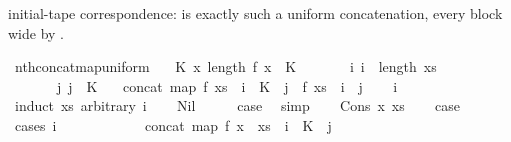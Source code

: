 \begin{isabellebody}
\begin{isamarkuptext}
  initial-tape correspondence:  is exactly
  such a uniform concatenation, every block 
  wide by .%
\end{isamarkuptext}\isamarkuptrue%
\isamarkupfalse%
\ nth{\isacharunderscore}{\kern0pt}concat{\isacharunderscore}{\kern0pt}map{\isacharunderscore}{\kern0pt}uniform{\isacharcolon}{\kern0pt}\isanewline
\ \ \ K{\isacharcolon}{\kern0pt}\ {\isachardoublequoteopen}{\isasymAnd}x{\isachardot}{\kern0pt}\ length\ {\isacharparenleft}{\kern0pt}f\ x{\isacharparenright}{\kern0pt}\ {\isacharequal}{\kern0pt}\ K{\isachardoublequoteclose}\isanewline
\ \ \ \ \ \ \ i{\isacharcolon}{\kern0pt}\ {\isachardoublequoteopen}i\ {\isacharless}{\kern0pt}\ length\ xs{\isachardoublequoteclose}\isanewline
\ \ \ \ \ \ \ j{\isacharcolon}{\kern0pt}\ {\isachardoublequoteopen}j\ {\isacharless}{\kern0pt}\ K{\isachardoublequoteclose}\isanewline
\ \ \ {\isachardoublequoteopen}concat\ {\isacharparenleft}{\kern0pt}map\ f\ xs{\isacharparenright}{\kern0pt}\ {\isacharbang}{\kern0pt}\ {\isacharparenleft}{\kern0pt}i\ {\isacharasterisk}{\kern0pt}\ K\ {\isacharplus}{\kern0pt}\ j{\isacharparenright}{\kern0pt}\ {\isacharequal}{\kern0pt}\ f\ {\isacharparenleft}{\kern0pt}xs\ {\isacharbang}{\kern0pt}\ i{\isacharparenright}{\kern0pt}\ {\isacharbang}{\kern0pt}\ j{\isachardoublequoteclose}\isanewline
%
\isadelimproof
\ \ %
\endisadelimproof
%
\isatagproof
{}\isamarkupfalse%
\ i\isanewline
{}\isamarkupfalse%
\ {\isacharparenleft}{\kern0pt}induct\ xs\ arbitrary{\isacharcolon}{\kern0pt}\ i{\isacharparenright}{\kern0pt}\isanewline
\ \ \isamarkupfalse%
\ Nil\isanewline
\ \ \isamarkupfalse%
\ \isamarkupfalse%
\ {\isacharquery}{\kern0pt}case\ \isamarkupfalse%
\ simp\isanewline
{}\isamarkupfalse%
\isanewline
\ \ \isamarkupfalse%
\ {\isacharparenleft}{\kern0pt}Cons\ x\ xs{\isacharparenright}{\kern0pt}\isanewline
\ \ \isamarkupfalse%
\ {\isacharquery}{\kern0pt}case\isanewline
\ \ \isamarkupfalse%
\ {\isacharparenleft}{\kern0pt}cases\ i{\isacharparenright}{\kern0pt}\isanewline
\ \ \ \ \isamarkupfalse%
\ {}\isanewline
\ \ \ \ \isamarkupfalse%
\ {\isachardoublequoteopen}concat\ {\isacharparenleft}{\kern0pt}map\ f\ {\isacharparenleft}{\kern0pt}x\ {\isacharhash}{\kern0pt}\ xs{\isacharparenright}{\kern0pt}{\isacharparenright}{\kern0pt}\ {\isacharbang}{\kern0pt}\ {\isacharparenleft}{\kern0pt}i\ {\isacharasterisk}{\kern0pt}\ K\ {\isacharplus}{\kern0pt}\ j{\isacharparenright}{\kern0pt}\isanewline

\end{isabellebody}
